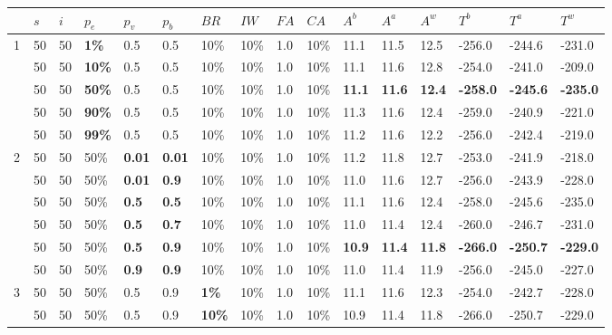 \begin{table}
    \tiny
    \hspace*{-1cm}
	\begin{tabular}{|l|l|l|l|l|l|l|l|l|l||l|l|l|l|l|l|}
 	\hline
 	~ & $s$ & $i$ & $p_{e}$ & $p_{v}$ & $p_{b}$ & $BR$ &$IW$ & $FA$ & $CA$ & $A^b$ & $A^a$ & $A^w$ & $T^b$ & $T^a$ & $T^w$\\
 	\hline
    1 & 50 & 50 & \textbf{1\%} & 0.5 & 0.5 & 10\% & 10\% & 1.0 & 10\% & 11.1 & 11.5 & 12.5 & -256.0 &-244.6 & -231.0  \\
    ~ & 50 & 50 & \textbf{10\%} & 0.5 & 0.5 & 10\% & 10\% & 1.0 & 10\% & 11.1 & 11.6 & 12.8 & -254.0 & -241.0 & -209.0 \\
    ~ & 50 & 50 & \textbf{50\%} & 0.5 & 0.5 & 10\% & 10\% & 1.0 & 10\% & \textbf{11.1} & \textbf{11.6} & \textbf{12.4} & \textbf{-258.0} & \textbf{-245.6} & \textbf{-235.0}\\
    ~ & 50 & 50 & \textbf{90\%} & 0.5 & 0.5 & 10\% & 10\% & 1.0 & 10\% &  11.3 & 11.6 & 12.4 & -259.0 & -240.9 & -221.0  \\
    ~ & 50 & 50 & \textbf{99\%} & 0.5 & 0.5 & 10\% & 10\% & 1.0 & 10\% &  11.2 & 11.6 & 12.2 & -256.0 & -242.4 & -219.0  \\
    \hline
    2 & 50 & 50 & 50\% & \textbf{0.01} & \textbf{0.01} & 10\% & 10\% & 1.0 & 10\% & 11.2 & 11.8 & 12.7 & -253.0 & -241.9 & -218.0  \\
    ~ & 50 & 50 & 50\% & \textbf{0.01} & \textbf{0.9} & 10\% & 10\% & 1.0 & 10\% &  11.0 & 11.6 & 12.7 & -256.0 & -243.9 & -228.0  \\
    ~ & 50 & 50 & 50\% & \textbf{0.5} & \textbf{0.5} & 10\% & 10\% & 1.0 & 10\% & 11.1 & 11.6 & 12.4 & -258.0 & -245.6 & -235.0 \\
    ~ & 50 & 50 & 50\% & \textbf{0.5} & \textbf{0.7} & 10\% & 10\% & 1.0 & 10\% &  11.0 & 11.4 & 12.4 & -260.0 & -246.7 & -231.0 \\
    ~ & 50 & 50 & 50\% & \textbf{0.5} & \textbf{0.9} & 10\% & 10\% & 1.0 & 10\% &  \textbf{10.9} & \textbf{11.4} & \textbf{11.8} & \textbf{-266.0} & \textbf{-250.7} & \textbf{-229.0} \\
    ~ & 50 & 50 & 50\% & \textbf{0.9} & \textbf{0.9} & 10\% & 10\% & 1.0 & 10\% &  11.0 & 11.4 & 11.9 & -256.0 & -245.0 & -227.0  \\
    \hline
    3 & 50 & 50 & 50\% & 0.5 & 0.9 & \textbf{1\%} & 10\% & 1.0 & 10\% & 11.1 & 11.6 & 12.3 & -254.0 & -242.7 & -228.0  \\
    ~ & 50 & 50 & 50\% & 0.5 & 0.9 & \textbf{10\%} & 10\% & 1.0 & 10\% &  10.9 & 11.4 & 11.8 & -266.0 & -250.7 & -229.0 \\

\end{tabular}
\end{table}
